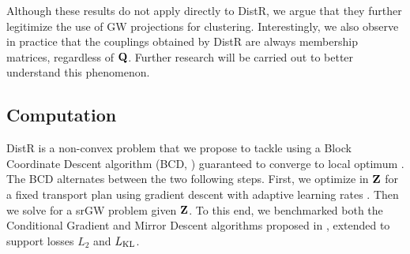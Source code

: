 Although these results do not apply directly to DistR, we argue that they further legitimize the use of GW projections for clustering. Interestingly, we also observe in practice that the couplings obtained by DistR are always membership matrices, regardless of ${\mathbf{Q}}$. Further research will be carried out to better understand this phenomenon. 


\subsection{Computation}\label{sec:computation_GW}

DistR is a non-convex problem that we propose to tackle using a Block Coordinate Descent algorithm (BCD, \citealt{tseng2001convergence}) guaranteed to converge to local optimum \cite{grippo2000convergence, Lyu2023bmm}. The BCD alternates between the two following steps. First, we optimize in ${\mathbf{Z}}$ for a fixed transport plan using gradient descent with adaptive learning rates \cite{kingma2014adam}. Then we solve for a srGW problem given ${\mathbf{Z}}$. To this end, we benchmarked both the Conditional Gradient and Mirror Descent algorithms proposed in \citet{vincent2021semi}, extended to support losses $L_2$ and $L_{\operatorname{KL}}$.

